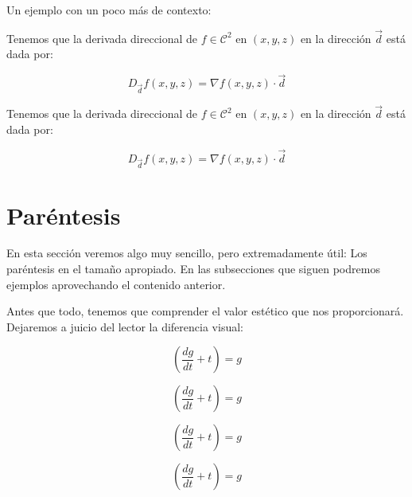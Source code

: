 \documentclass[graybox,envcountchap,sectrefs]{svmono}
\begin{document}
    Un ejemplo con un poco más de contexto:
            \begin{code}
                Tenemos que la derivada direccional de \(f\in \mathcal{C}^2\)
                en \((x,y,z)\) en la dirección \(\vec{d}\) está dada por:
                
                \[D_{\vec{d}}f(x,y,z) = \nabla f(x,y,z)\cdot \vec{d}\]
            \end{code}
            \begin{compiled}
                Tenemos que la derivada direccional de \(f\in \mathcal{C}^2\)
                en \((x,y,z)\) en la dirección \(\vec{d}\) está dada por:
                
                \[D_{\vec{d}}f(x,y,z) = \nabla f(x,y,z)\cdot \vec{d}\]
            \end{compiled}
    

            \section{Paréntesis}
            En esta sección veremos algo muy sencillo, pero extremadamente útil: Los paréntesis en el tamaño apropiado.
            En las subsecciones que siguen podremos ejemplos aprovechando el contenido anterior.

            Antes que todo, tenemos que comprender el valor estético que nos proporcionará.
            Dejaremos a juicio del lector la diferencia visual:

            \begin{tcbraster}[raster columns=2, raster equal height]
                \begin{code}
                    \[(\frac{dg}{dt}+t)=g\]
                \end{code}
                \begin{compiled}
                    \[(\frac{dg}{dt}+t)=g\]
                \end{compiled}
            \end{tcbraster}

            \begin{tcbraster}[raster columns=2, raster equal height]
                \begin{code}
                    \[\left(\frac{dg}{dt}+t\right)=g\]
                \end{code}
                \begin{compiled}
                    \[\left(\frac{dg}{dt}+t\right)=g\]
                \end{compiled}
            \end{tcbraster}
\end{document}
